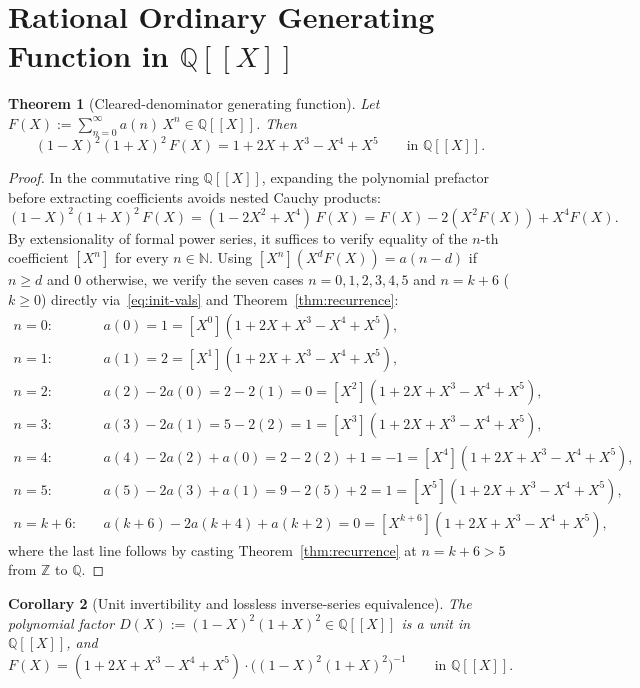 \documentclass[11pt]{article}
\newcommand{\llbracket}{[\![}
\newcommand{\rrbracket}{]\!]}
\newtheorem{theorem}{Theorem}[section]
\newtheorem{corollary}[theorem]{Corollary}
\theoremstyle{definition}
\newcommand{\N}{\mathbb{N}}
\newcommand{\Z}{\mathbb{Z}}
\newcommand{\Q}{\mathbb{Q}}
\begin{document}
\section{Rational Ordinary Generating Function in \texorpdfstring{$\Q\llbracket X \rrbracket$}{Q[[X]]}}

\begin{theorem}[Cleared-denominator generating function]
\label{thm:gf}
Let $F(X) := \sum_{n=0}^{\infty} a(n)\,X^n \in \Q\llbracket X \rrbracket$. Then
\begin{equation}
\label{eq:gf-cleared}
(1 - X)^2 (1 + X)^2 \, F(X) = 1 + 2X + X^3 - X^4 + X^5 \qquad \text{in }\Q\llbracket X \rrbracket.
\end{equation}
\end{theorem}

\begin{proof}
In the commutative ring $\Q\llbracket X \rrbracket$, expanding the polynomial prefactor before extracting coefficients avoids nested Cauchy products:
\[
(1 - X)^2 (1 + X)^2 \, F(X) = (1 - 2X^2 + X^4)\,F(X) = F(X) - 2(X^2 F(X)) + X^4 F(X).
\]
By extensionality of formal power series, it suffices to verify equality of the $n$-th coefficient $[X^n]$ for every $n \in \N$. Using $[X^n](X^d F(X)) = a(n - d)$ if $n \ge d$ and $0$ otherwise, we verify the seven cases $n = 0, 1, 2, 3, 4, 5$ and $n = k + 6$ ($k \ge 0$) directly via~\eqref{eq:init-vals} and Theorem~\ref{thm:recurrence}:
\begin{align*}
n = 0:\quad & a(0) = 1 = [X^0](1 + 2X + X^3 - X^4 + X^5), \\
n = 1:\quad & a(1) = 2 = [X^1](1 + 2X + X^3 - X^4 + X^5), \\
n = 2:\quad & a(2) - 2a(0) = 2 - 2(1) = 0 = [X^2](1 + 2X + X^3 - X^4 + X^5), \\
n = 3:\quad & a(3) - 2a(1) = 5 - 2(2) = 1 = [X^3](1 + 2X + X^3 - X^4 + X^5), \\
n = 4:\quad & a(4) - 2a(2) + a(0) = 2 - 2(2) + 1 = -1 = [X^4](1 + 2X + X^3 - X^4 + X^5), \\
n = 5:\quad & a(5) - 2a(3) + a(1) = 9 - 2(5) + 2 = 1 = [X^5](1 + 2X + X^3 - X^4 + X^5), \\
n = k + 6:\quad & a(k + 6) - 2a(k + 4) + a(k + 2) = 0 = [X^{k+6}](1 + 2X + X^3 - X^4 + X^5),
\end{align*}
where the last line follows by casting Theorem~\ref{thm:recurrence} at $n = k + 6 > 5$ from $\Z$ to $\Q$.
\end{proof}

\begin{corollary}[Unit invertibility and lossless inverse-series equivalence]
\label{cor:unit-inv}
The polynomial factor $D(X) := (1 - X)^2(1 + X)^2 \in \Q\llbracket X \rrbracket$ is a unit in $\Q\llbracket X \rrbracket$, and
\[
F(X) = (1 + 2X + X^3 - X^4 + X^5) \cdot \bigl((1 - X)^2(1 + X)^2\bigr)^{-1} \qquad \text{in }\Q\llbracket X \rrbracket.
\]
\end{corollary}
\end{document}
